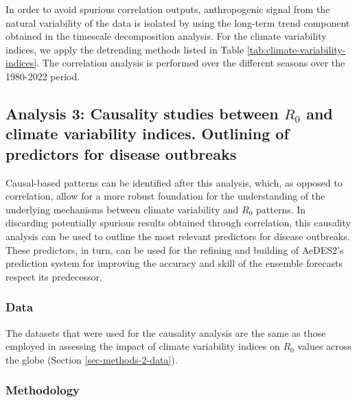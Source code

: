 \documentclass[fleqn,10pt]{wlscirep}
\begin{document}
  In order to avoid spurious correlation outputs, anthropogenic signal from the natural variability of the data is isolated by using the long-term trend component obtained in the timescale decomposition analysis. For the climate variability indices, we apply the detrending methods listed in Table \ref{tab:climate-variability-indices}. The correlation analysis is performed over the different seasons over the 1980-2022 period.

  \subsection{Analysis 3: Causality studies between $R_0$ and climate variability indices. Outlining of predictors for disease outbreaks} \label{sec-methods-3}

  Causal-based patterns can be identified after this analysis, which, as opposed to correlation, allow for a more robust foundation for the understanding of the underlying mechanisms between climate variability and $R_0$ patterns. In discarding potentially spurious results obtained through correlation, this causality analysis can be used to outline the most relevant predictors for disease outbreaks. These predictors, in turn, can be used for the refining and building of AeDES2's prediction system for improving the accuracy and skill of the ensemble forecasts respect its predecessor.

  \subsubsection{Data} \label{sec-methods-3-data}

  The datasets that were used for the causality analysis are the same as those employed in assessing the impact of climate variability indices on $R_0$ values across the globe (Section \ref{sec-methods-2-data}).

  \subsubsection{Methodology} \label{sec-methods-3-methodology}
\end{document}
